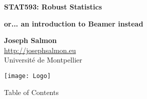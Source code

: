 \documentclass[unknownkeysallowed]{beamer}
\begin{document}
\begin{frame}
\bigskip
\bigskip
\begin{center}{
\LARGE\color{marron}
\textbf{STAT593: Robust Statistics}
\textbf{ }\\
\vspace{0.5cm}
}

\color{marron}
\textbf{or... an introduction to Beamer instead}
\end{center}

\vspace{0.5cm}

\begin{center}
\textbf{Joseph Salmon} \\
\vspace{0.1cm}
\url{http://josephsalmon.eu}\\
\vspace{0.5cm}
Université de Montpellier \\
\end{center}

\centering
\texttt{[image: Logo]}

\end{frame}






\begin{frame}{Table of Contents}
\tableofcontents[hideallsubsections]
\end{frame}







\end{document}
